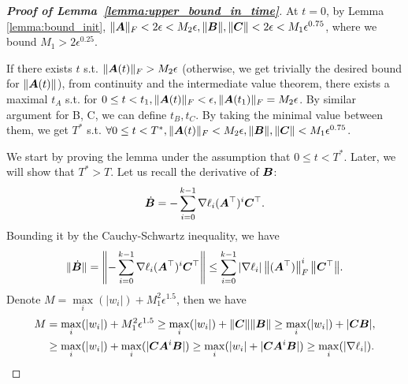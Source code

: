 \begin{proof}[\textbf{Proof of Lemma~\ref{lemma:upper_bound_in_time}}]
%
At $t=0$, by Lemma \ref{lemma:bound_init}, $\|{\bm{A}}\|_F < 2 \epsilon < M_2 \epsilon, \|{\bm{B}}\|, \|{\bm{C}}\| < 2 \epsilon < M_1 \epsilon^{0.75}$, where we bound $M_1>2\epsilon^{0.25}$.

If there exists $t$ s.t. $\|{\bm{A}}(t)\|_F>M_2 \epsilon$ (otherwise, we get trivially the desired bound for $\|{\bm{A}}(t)\|$), from continuity and the intermediate value theorem, there exists a maximal $t_A$ s.t. for $0 \leq t < t_1, \|{\bm{A}}(t)\|_F <  \epsilon, \|{\bm{A}}(t_1)\|_F =M_2 \epsilon$.
By similar argument for B, C, we can define $t_B, t_C$. By taking the minimal value between them, we get $T^*$ s.t. $\forall 0 \leq t<T^*, \|{\bm{A}}(t)\|_F < M_2 \epsilon, \|{\bm{B}}\|, \|{\bm{C}}\| < M_1 \epsilon^{0.75}$.

We start by proving the lemma under the assumption that $0 \leq t<T^*$. Later, we will show that $T^*>T$. 
%
Let us recall the derivative of ${\bm{B}}$:
\begin{equation}
    \dot{{\bm{B}}} = -\sum_{i=0}^{k-1} \nabla \ell_i ({\bm{A}}^\top)^i {\bm{C}}^\top.
\end{equation}
%
Bounding it by the Cauchy-Schwartz inequality, we have
\begin{equation}
\label{eq:B_dot_CS_inequality1}
    \|\dot{{\bm{B}}}\| = \left\|-\sum_{i=0}^{k-1} \nabla \ell_i ({\bm{A}}^\top)^i {\bm{C}}^\top\right\| \leq \sum_{i=0}^{k-1} |\nabla \ell_i| \left\|({\bm{A}}^\top)\right\|_F^i \big\|{\bm{C}}^\top\big\|.
\end{equation}
%
Denote $M = \underset{i}{\max}(|w_i|)+M_1^2\epsilon^{1.5}$, then we have
\begin{align}
    M &= \underset{i}{\max}(|w_i|)+M_1^2\epsilon^{1.5} \geq \underset{i}{\max}(|w_i|)+\|{\bm{C}}\| \|{\bm{B}}\| \geq \underset{i}{\max}(|w_i|)+|{\bm{C}}{\bm{B}}|, \\ &\geq \underset{i}{\max}(|w_i|)+\underset{i}{\max}(|{\bm{C}}{\bm{A}}^i {\bm{B}}|) \geq \underset{i}{\max}(|w_i|+|{\bm{C}}{\bm{A}}^i {\bm{B}}|) \geq \underset{i}{\max}(|\nabla \ell_i|).
\end{align}


\end{proof}
